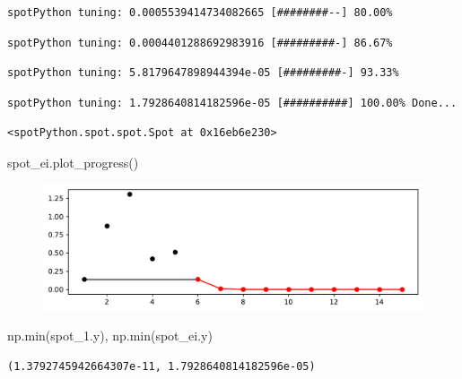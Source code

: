 \documentclass[
  letterpaper,
  DIV=11,
  numbers=noendperiod]{scrreprt}
\newenvironment{Shaded}{\begin{snugshade}}{\end{snugshade}}
\newcommand{\BuiltInTok}[1]{\textcolor[rgb]{0.00,0.23,0.31}{#1}}
\newcommand{\NormalTok}[1]{\textcolor[rgb]{0.00,0.23,0.31}{#1}}
\begin{document}
\begin{verbatim}
spotPython tuning: 0.0005539414734082665 [########--] 80.00% 
\end{verbatim}

\begin{verbatim}
spotPython tuning: 0.0004401288692983916 [#########-] 86.67% 
\end{verbatim}

\begin{verbatim}
spotPython tuning: 5.8179647898944394e-05 [#########-] 93.33% 
\end{verbatim}

\begin{verbatim}
spotPython tuning: 1.7928640814182596e-05 [##########] 100.00% Done...
\end{verbatim}

\begin{verbatim}
<spotPython.spot.spot.Spot at 0x16eb6e230>
\end{verbatim}

\begin{Shaded}
\begin{Highlighting}[]
\NormalTok{spot\_ei.plot\_progress()}
\end{Highlighting}
\end{Shaded}

\begin{figure}[H]

{\centering \includegraphics{07_spot_ei_files/figure-pdf/cell-19-output-1.pdf}

}

\end{figure}

\begin{Shaded}
\begin{Highlighting}[]
\NormalTok{np.}\BuiltInTok{min}\NormalTok{(spot\_1.y), np.}\BuiltInTok{min}\NormalTok{(spot\_ei.y)}
\end{Highlighting}
\end{Shaded}

\begin{verbatim}
(1.3792745942664307e-11, 1.7928640814182596e-05)
\end{verbatim}
\end{document}
